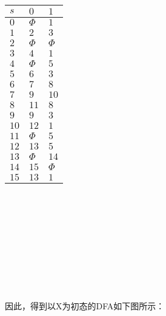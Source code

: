 \documentclass{article}
\begin{document}
\begin{table}[h!]
    \centering
\begin{tabular}{|p{3cm}<{\centering}|p{3cm}<{\centering}|p{3cm}<{\centering}|}   
    \hline
    $s$ & $0$ & $1$ \\
    \hline
    $0$ & $\Phi$ & $1$ \\
    \hline
    $1$ & $2$ & $3$ \\
    \hline
    $2$ & $\Phi$ & $\Phi$ \\
    \hline
    $3$ & $4$ & $1$ \\
    \hline
    $4$ & $\Phi$ & $5$ \\
    \hline
    $5$ & $6$ & $3$ \\
    \hline
    $6$ & $7$ & $8$ \\
    \hline
    $7$ & $9$ & $10$ \\
    \hline
    $8$ & $11$ & $8$ \\
    \hline
    $9$ & $9$ & $3$ \\
    \hline
    $10$ & $12$ & $1$ \\
    \hline
    $11$ & $\Phi$ & $5$ \\
    \hline
    $12$ & $13$ & $5$ \\
    \hline
    $13$ & $\Phi$ & $14$ \\
    \hline
    $14$ & $15$ & $\Phi$ \\
    \hline
    $15$ & $13$ & $1$ \\
    \hline
\end{tabular}
\end{table}
\ \\ \\ \\ \\ \\ \\ \\ \\ \\
因此，得到以X为初态的DFA如下图所示：
\end{document}
